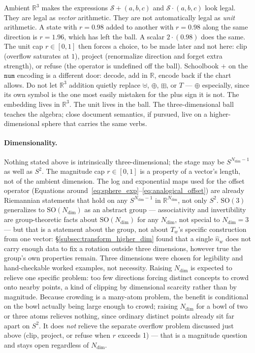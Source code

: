 \documentclass[12pt, a4paper]{article}
\begin{document}
Ambient $\mathbb{R}^3$ makes the expressions
$\mathcal{S}+(a,b,c)$ and $\mathcal{S}\cdot(a,b,c)$ look legal.
They are legal as \emph{vector} arithmetic. They are not automatically
legal as \emph{unit} arithmetic. A state with $r=0.98$ added to
another with $r=0.98$ along the same direction is $r=1.96$, which
has left the ball. A scalar $2\cdot(0.98)$ does the same. The unit
cap $r\in[0,1]$ then forces a choice, to be made later and not
here: clip (overflow saturates at $1$), project (renormalize
direction and forget extra strength), or refuse (the operator is
undefined off the ball). Schoolbook $+$ on the $\mathtt{num}$
encoding is a different door: decode, add in $\mathbb{R}$, encode
back if the chart allows. Do not let $\mathbb{R}^3$ addition
quietly replace $\uplus$, $\oplus$, $\boxplus$, or $T$ --- $\oplus$
especially, since its own symbol is the one most easily mistaken for
the plus sign it is not. The embedding
lives in $\mathbb{R}^3$. The unit lives in the ball.
The three-dimensional ball teaches the algebra; close document
semantics, if pursued, live on a higher-dimensional sphere that
carries the same verbs.

\paragraph{Dimensionality.}
\label{subsec:dimensionality_open}
Nothing stated
above is intrinsically three-dimensional; the stage may be
$S^{N_{\mathrm{dim}}-1}$ as well as $S^2$. The magnitude cap
$r\in[0,1]$ is a property of a vector's length, not of the ambient
dimension. The log and exponential maps used for the offset operator
(Equations around~\eqref{eq:sphere_exp}--\eqref{eq:analogical_offset})
are already Riemannian statements that hold on any $S^{N_{\mathrm{dim}}-1}$ in
$\mathbb{R}^{N_{\mathrm{dim}}}$, not only $S^2$. $\mathrm{SO}(3)$ generalizes to
$\mathrm{SO}(N_{\mathrm{dim}})$ as an abstract group --- associativity and
invertibility are group-theoretic facts about $\mathrm{SO}(N_{\mathrm{dim}})$ for
any $N_{\mathrm{dim}}$, not special to $N_{\mathrm{dim}}=3$ --- but that is a statement about the
group, not about $T_w$'s specific construction from one vector:
\S\ref{subsec:transform_higher_dim} found that a single $\hat n_w$
does not carry enough data to fix a rotation outside three
dimensions, however true the group's own properties remain. Three
dimensions were chosen for legibility and hand-checkable worked
examples, not necessity. Raising $N_{\mathrm{dim}}$ is expected to relieve one
specific problem: too few directions forcing distinct concepts to
crowd onto nearby points, a kind of clipping by dimensional scarcity
rather than by magnitude. Because crowding is a many-atom problem, the
benefit is conditional on the bowl actually being large enough to
crowd; raising $N_{\mathrm{dim}}$ for a bowl of two or three atoms relieves nothing,
since ordinary distinct points already sit far apart on $S^2$. It does
\emph{not} relieve the separate
overflow problem discussed just above (clip, project, or refuse when
$r$ exceeds 1) --- that is a magnitude question and stays open
regardless of $N_{\mathrm{dim}}$.
\end{document}

